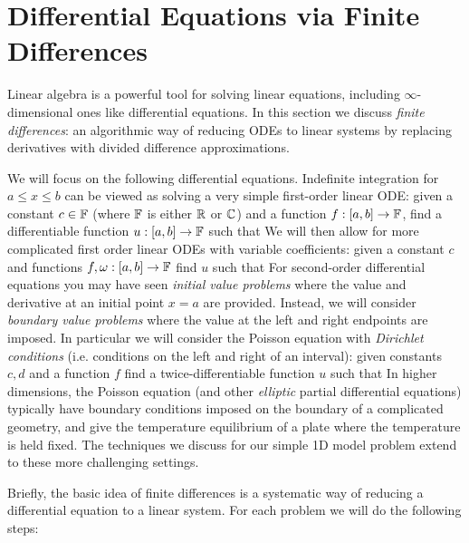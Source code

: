 
\section{Differential Equations via Finite Differences}
Linear algebra is a powerful tool for solving linear equations, including \ensuremath{\infty}-dimensional ones like differential equations. In this section we discuss \emph{finite differences}: an algorithmic way of reducing ODEs to linear systems by replacing derivatives with divided difference approximations. 

We will focus on the following differential equations. Indefinite integration for $a \ensuremath{\leq} x \ensuremath{\leq} b$ can be viewed as solving a very simple first-order linear ODE: given a constant $c \in {\mathbb F}$ (where  ${\mathbb F}$ is either ${\mathbb R}$ or ${\mathbb C}$) and a function $f : [a,b] \rightarrow {\mathbb F}$, find a differentiable function $u : [a,b] \rightarrow {\mathbb F}$ such that
We will then allow for more complicated first order linear ODEs with variable coefficients: given  a constant $c$ and functions $f,\omega : [a,b] \rightarrow {\mathbb F}$ find $u$ such that
For second-order differential equations you may have seen \emph{initial value problems} where the value and derivative at an initial point $x=a$ are provided.  Instead, we will consider \emph{boundary value problems} where the value at the left and right endpoints are imposed. In particular we will consider the Poisson equation with \emph{Dirichlet conditions} (i.e. conditions on the left and right of an interval): given constants $c,d$ and a function $f$ find a twice-differentiable function $u$ such that
In higher dimensions, the Poisson equation (and other \emph{elliptic} partial differential equations) typically have boundary conditions imposed on the boundary of a complicated geometry, and give the temperature equilibrium of a plate where the temperature is held fixed. The techniques we discuss for our simple 1D model problem extend to these more challenging settings.

Briefly, the basic idea of finite differences is a systematic way of reducing a differential equation to a linear system. For each problem we will do the following steps:

